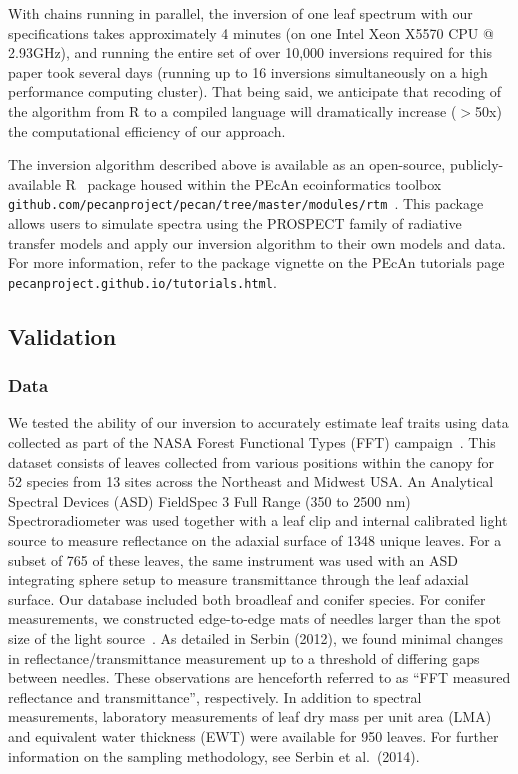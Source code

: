With chains running in parallel, the inversion of one leaf spectrum with our specifications takes approximately 4 minutes (on one Intel Xeon X5570 CPU @ 2.93GHz), and running the entire set of over 10,000 inversions required for this paper took several days (running up to 16 inversions simultaneously on a high performance computing cluster).
That being said, we anticipate that recoding of the algorithm from R to a compiled language will dramatically increase ($>$50x) the computational efficiency of our approach.

The inversion algorithm described above is available as an open-source, publicly-available R~\cite{rstats} package housed within the PEcAn ecoinformatics toolbox \texttt{github.com/pecanproject/pecan/tree/master/modules/rtm}~\cite{dietze_improving_2013,lebauer_facilitating_2013}.
This package allows users to simulate spectra using the PROSPECT family of radiative transfer models and apply our inversion algorithm to their own models and data.
For more information, refer to the package vignette on the PEcAn tutorials page \texttt{pecanproject.github.io/tutorials.html}.

\subsection{Validation}

\subsubsection{Data}

We tested the ability of our inversion to accurately estimate leaf traits using data collected as part of the NASA Forest Functional Types (FFT) campaign~\cite{deel_2012_relationship,serbin_spectroscopic_2014,singh_imaging_2015}.
This dataset consists of leaves collected from various positions within the canopy for 52 species from 13 sites across the Northeast and Midwest USA\@.
An Analytical Spectral Devices (ASD) FieldSpec 3 Full Range (350 to 2500 nm) Spectroradiometer was used together with a leaf clip and internal calibrated light source to measure reflectance on the adaxial surface of 1348 unique leaves.
For a subset of 765 of these leaves, the same instrument was used with an ASD integrating sphere setup to measure transmittance through the leaf adaxial surface.
Our database included both broadleaf and conifer species.
For conifer measurements, we constructed edge-to-edge mats of needles larger than the spot size of the light source~\cite{serbin_2012_spectroscopic,singh_imaging_2015}.
As detailed in Serbin (2012), we found minimal changes in reflectance/transmittance measurement up to a threshold of differing gaps between needles. \nocite{serbin_2012_spectroscopic}
These observations are henceforth referred to as ``FFT measured reflectance and transmittance'', respectively.
In addition to spectral measurements, laboratory measurements of leaf dry mass per unit area (LMA) and equivalent water thickness (EWT) were available for 950 leaves.
For further information on the sampling methodology, see Serbin et al.~(2014). \nocite{serbin_spectroscopic_2014}

